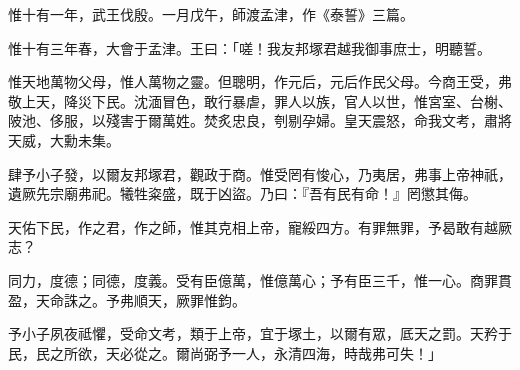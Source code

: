 
\begin{pinyinscope}
惟十有一年，武王伐殷。一月戊午，師渡孟津，作《泰誓》三篇。

惟十有三年春，大會于孟津。王曰：「嗟！我友邦塚君越我御事庶士，明聽誓。

惟天地萬物父母，惟人萬物之靈。但聰明，作元后，元后作民父母。今商王受，弗敬上天，降災下民。沈湎冒色，敢行暴虐，罪人以族，官人以世，惟宮室、台榭、陂池、侈服，以殘害于爾萬姓。焚炙忠良，刳剔孕婦。皇天震怒，命我文考，肅將天威，大勳未集。

肆予小子發，以爾友邦塚君，觀政于商。惟受罔有悛心，乃夷居，弗事上帝神祇，遺厥先宗廟弗祀。犧牲粢盛，既于凶盜。乃曰：『吾有民有命！』罔懲其侮。

天佑下民，作之君，作之師，惟其克相上帝，寵綏四方。有罪無罪，予曷敢有越厥志？

同力，度德；同德，度義。受有臣億萬，惟億萬心；予有臣三千，惟一心。商罪貫盈，天命誅之。予弗順天，厥罪惟鈞。

予小子夙夜祗懼，受命文考，類于上帝，宜于塚土，以爾有眾，厎天之罰。天矜于民，民之所欲，天必從之。爾尚弼予一人，永清四海，時哉弗可失！」


\end{pinyinscope}